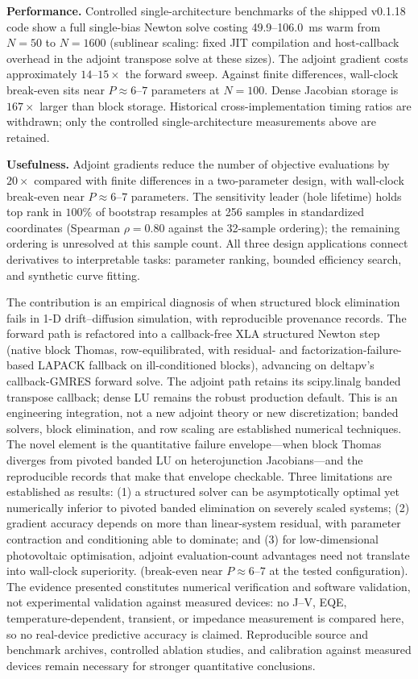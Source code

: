 \textbf{Performance.} Controlled single-architecture benchmarks of the
shipped v0.1.18 code show a full single-bias Newton solve costing
49.9--106.0~ms warm from $N=50$ to $N=1600$ (sublinear scaling: fixed JIT compilation and host-callback overhead in the adjoint transpose solve at these sizes). The adjoint
gradient costs approximately $14$--$15\times$ the forward sweep.
Against finite differences, wall-clock break-even sits near $P\approx
6$--$7$ parameters at $N=100$. Dense Jacobian storage is $167\times$
larger than block storage. Historical cross-implementation timing
ratios are withdrawn; only the controlled single-architecture
measurements above are retained.

\textbf{Usefulness.} Adjoint gradients reduce the number of objective
evaluations by $20\times$ compared with finite differences in a
two-parameter design, with wall-clock break-even near $P\approx6$--$7$
parameters. The sensitivity leader (hole lifetime) holds top rank in
$100\%$ of bootstrap resamples at 256 samples in standardized
coordinates (Spearman $\rho=0.80$ against the 32-sample ordering);
the remaining ordering is unresolved at this sample count.
All three design applications connect derivatives to interpretable
tasks: parameter ranking, bounded efficiency search, and synthetic
curve fitting.

The contribution is an empirical diagnosis of when structured block
elimination fails in 1-D drift--diffusion simulation, with reproducible
provenance records. The forward path is refactored into a callback-free
XLA structured Newton step (native block Thomas, row-equilibrated, with
residual- and factorization-failure-based LAPACK fallback on ill-conditioned blocks),
advancing on deltapv's
callback-GMRES forward solve. The adjoint path retains its
scipy.linalg banded transpose callback; dense LU remains the robust
production default. This is an engineering integration, not a new
adjoint theory or new discretization; banded solvers, block elimination,
and row scaling are established numerical techniques. The novel element
is the quantitative failure envelope---when block Thomas diverges from
pivoted banded LU on heterojunction Jacobians---and the reproducible
records that make that envelope checkable. Three limitations are
established as results: (1) a structured solver can be asymptotically
optimal yet numerically inferior to pivoted banded elimination on
severely scaled systems; (2) gradient accuracy depends on more than
linear-system residual, with parameter contraction and conditioning able
to dominate; and (3) for low-dimensional photovoltaic optimisation,
adjoint evaluation-count advantages need not translate into wall-clock
superiority.
(break-even near $P\approx6$--$7$ at the tested configuration). The evidence presented constitutes numerical verification and
software validation, not experimental validation against measured
devices: no J--V, EQE, temperature-dependent, transient, or impedance
measurement is compared here, so no real-device predictive accuracy is
claimed. Reproducible source and benchmark archives, controlled
ablation studies, and calibration against measured devices remain
necessary for stronger quantitative conclusions.

